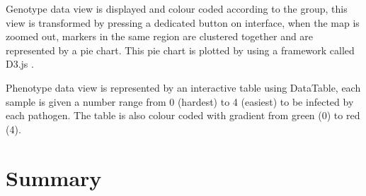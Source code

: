 \documentclass[9pt,a4paper]{extarticle}
\begin{document}
Genotype data view is displayed and colour coded according to the group, this view is transformed by pressing a dedicated button on interface, when the map is zoomed out, markers in the same region are clustered together and are represented by a pie chart. This pie chart is plotted by using a framework called D3.js \cite{d3js}.

Phenotype data view is represented by an interactive table using DataTable, each sample is given a number range from 0 (hardest) to 4 (easiest) to be infected by each pathogen. The table is also colour coded with gradient from green (0) to red (4).




\section*{Summary} %

\end{document}
